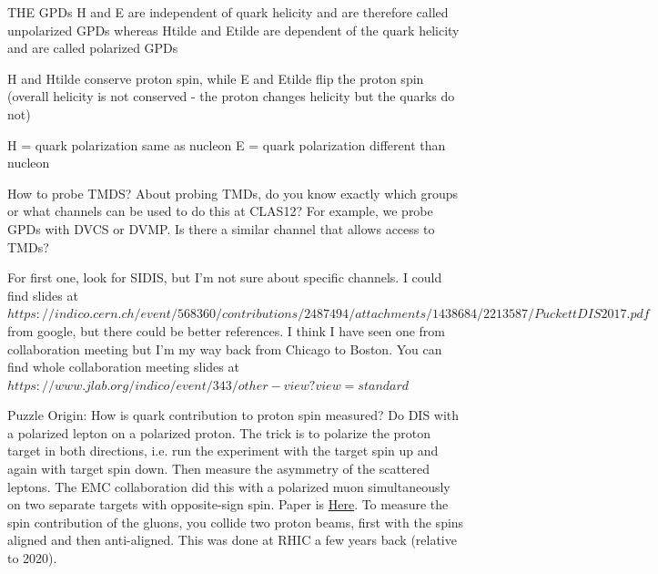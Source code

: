         
    
            THE GPDs H and E are independent of quark helicity and are therefore called unpolarized GPDs whereas Htilde and Etilde are dependent of the quark helicity and are called polarized GPDs
            
            H and Htilde conserve proton spin, while E and Etilde flip the proton spin (overall helicity is not conserved - the proton changes helicity but the quarks do not) 
            
            
            H = quark polarization same as nucleon
            E = quark polarization different than nucleon

            \fi


              How to probe TMDS?
            About probing TMDs, do you know exactly which groups or what channels can be used to do this at CLAS12? For example, we probe GPDs with DVCS or DVMP. Is there a similar channel that allows access to TMDs?
            
            For first one, look for SIDIS, but I'm not sure about specific channels. I could find slides at
            $https://indico.cern.ch/event/568360/contributions/2487494/attachments/1438684/2213587/PuckettDIS2017.pdf$ from google, but there could be better references. I think I have seen one from collaboration meeting but I'm my way back from Chicago to Boston. You can find whole collaboration meeting slides at $https://www.jlab.org/indico/event/343/other-view?view=standard$
    
            Puzzle Origin: How is quark contribution to proton spin measured?
            Do DIS with a polarized lepton on a polarized proton. The trick is to polarize the proton target in both directions, i.e. run the experiment with the target spin up and again with target spin down. Then measure the asymmetry of the scattered leptons. The EMC collaboration did this with a polarized muon simultaneously on two separate targets with opposite-sign spin. Paper is \href{https://www-sciencedirect-com.libproxy.mit.edu/science/article/pii/0550321389900898?via\%3Dihub}{Here}. To measure the spin contribution of the gluons, you collide two proton beams, first with the spins aligned and then anti-aligned. This was done at RHIC a few years back (relative to 2020). 

    
            
\fi